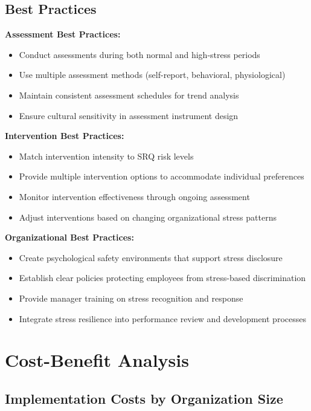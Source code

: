 \documentclass[11pt,a4paper]{article}
\begin{document}
\subsection{Best Practices}

\textbf{Assessment Best Practices:}
\begin{itemize}
\item Conduct assessments during both normal and high-stress periods
\item Use multiple assessment methods (self-report, behavioral, physiological)
\item Maintain consistent assessment schedules for trend analysis
\item Ensure cultural sensitivity in assessment instrument design
\end{itemize}

\textbf{Intervention Best Practices:}
\begin{itemize}
\item Match intervention intensity to SRQ risk levels
\item Provide multiple intervention options to accommodate individual preferences
\item Monitor intervention effectiveness through ongoing assessment
\item Adjust interventions based on changing organizational stress patterns
\end{itemize}

\textbf{Organizational Best Practices:}
\begin{itemize}
\item Create psychological safety environments that support stress disclosure
\item Establish clear policies protecting employees from stress-based discrimination
\item Provide manager training on stress recognition and response
\item Integrate stress resilience into performance review and development processes
\end{itemize}

\section{Cost-Benefit Analysis}

\subsection{Implementation Costs by Organization Size}
\end{document}
